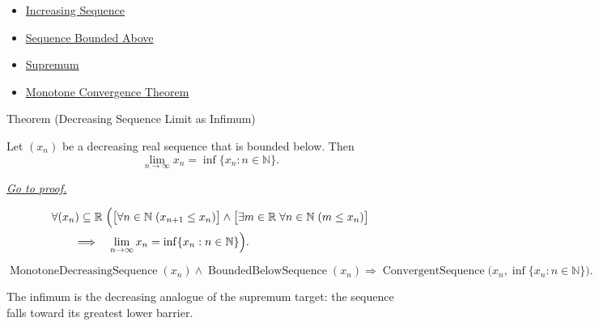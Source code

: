 \begin{remark*}[Dependencies]\hfill
\begin{itemize}
  \item \hyperref[def:increasing-sequence]{Increasing Sequence}
  \item \hyperref[def:sequence-bounded-above]{Sequence Bounded Above}
  \item \hyperref[def:supremum]{Supremum}
  \item \hyperref[thm:monotone-convergence-theorem]{Monotone Convergence Theorem}
\end{itemize}
\end{remark*}


\begin{theorembox}{Theorem (Decreasing Sequence Limit as Infimum)}
\begin{theorem}
\label{thm:decreasing-sequence-limit-as-infimum}
Let $(x_n)$ be a decreasing real sequence that is bounded below. Then
\[
  \lim_{n\to\infty}x_n=\inf\{x_n:n\in\mathbb{N}\}.
\]

\smallskip
\noindent
\hyperref[prf:decreasing-sequence-limit-as-infimum]{\textit{Go to proof.}}
\end{theorem}
\end{theorembox}

\begin{remark*}
\[
\begin{aligned}
&\forall (x_n)\subseteq\mathbb{R}\;
\Bigl(
  \bigl[\forall n\in\mathbb{N}\;(x_{n+1}\le x_n)\bigr]
  \land
  \bigl[\exists m\in\mathbb{R}\;\forall n\in\mathbb{N}\;(m\le x_n)\bigr]\\
&\qquad\Longrightarrow\quad
  \lim_{n\to\infty}x_n=\inf\{x_n:n\in\mathbb{N}\}
\Bigr).
\end{aligned}
\]
\end{remark*}

\begin{remark*}
\[
\operatorname{MonotoneDecreasingSequence}(x_n)
\land
\operatorname{BoundedBelowSequence}(x_n)
\Longrightarrow
\operatorname{ConvergentSequence}\bigl(x_n,\inf\{x_n:n\in\mathbb{N}\}\bigr).
\]
\end{remark*}

\begin{remark*}[Interpretation]
The infimum is the decreasing analogue of the supremum target: the sequence
falls toward its greatest lower barrier.
\end{remark*}

